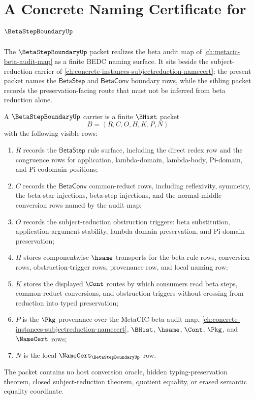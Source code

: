 \chapter{A Concrete Naming Certificate for $\BetaStepBoundaryUp$}
\label{ch:concrete-instances-betastepboundary-namecert}

The $\BetaStepBoundaryUp$ packet realizes the beta audit map of
\autoref{ch:metacic-beta-audit-map} as a finite BEDC naming surface. It sits
beside the subject-reduction carrier of
\autoref{ch:concrete-instances-subjectreduction-namecert}: the present packet
names the $\mathsf{BetaStep}$ and $\mathsf{BetaConv}$ boundary rows, while the
sibling packet records the preservation-facing route that must not be inferred
from beta reduction alone.

\begin{definition}
\label{def:beta-step-boundary-carrier}
A $\BetaStepBoundaryUp$ carrier is a finite $\BHist$ packet
$$
B=(R,C,O,H,K,P,N)
$$
with the following visible rows:
\begin{enumerate}
\item $R$ records the $\mathsf{BetaStep}$ rule surface, including the direct
redex row and the congruence rows for application, lambda-domain, lambda-body,
Pi-domain, and Pi-codomain positions;
\item $C$ records the $\mathsf{BetaConv}$ common-reduct rows, including
reflexivity, symmetry, the beta-star injections, beta-step injections, and the
normal-middle conversion rows named by the audit map;
\item $O$ records the subject-reduction obstruction triggers: beta
substitution, application-argument stability, lambda-domain preservation, and
Pi-domain preservation;
\item $H$ stores componentwise $\hsame$ transports for the beta-rule rows,
conversion rows, obstruction-trigger rows, provenance row, and local naming row;
\item $K$ stores the displayed $\Cont$ routes by which consumers read beta
steps, common-reduct conversions, and obstruction triggers without crossing
from reduction into typed preservation;
\item $P$ is the $\Pkg$ provenance over the MetaCIC beta audit map,
\autoref{ch:concrete-instances-subjectreduction-namecert}, $\BHist$,
$\hsame$, $\Cont$, $\Pkg$, and $\NameCert$ rows;
\item $N$ is the local $\NameCert_{\BetaStepBoundaryUp}$ row.
\end{enumerate}
The packet contains no host conversion oracle, hidden typing-preservation
theorem, closed subject-reduction theorem, quotient equality, or erased
semantic equality coordinate.
\end{definition}

